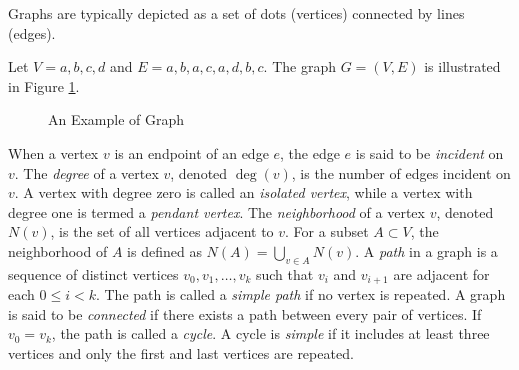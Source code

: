 Graphs are typically depicted as a set of dots (vertices) connected by lines (edges).

\begin{example}
\label{ex:Graph-Example}
Let $V = {a, b, c, d}$ and $E = { {a, b}, {a, c}, {a, d}, {b, c} }$. The graph $G = (V, E)$ is illustrated in Figure \ref{fig:Graph-Example}.
\end{example}

\begin{figure}[t]
\centering
{}
\caption{\label{fig:Graph-Example}An Example of Graph}
\end{figure}

When a vertex $v$ is an endpoint of an edge $e$, the edge $e$ is said to be \emph{incident} on $v$. The \emph{degree} of a vertex $v$, denoted $\deg(v)$, is the number of edges incident on $v$. A vertex with degree zero is called an \emph{isolated vertex}, while a vertex with degree one is termed a \emph{pendant vertex}. The \emph{neighborhood} of a vertex $v$, denoted $N(v)$, is the set of all vertices adjacent to $v$. For a subset $A \subset V$, the neighborhood of $A$ is defined as $N(A) = \bigcup_{v \in A} N(v)$. A \emph{path} in a graph is a sequence of distinct vertices ${v_0, v_1, \ldots, v_k}$ such that $v_i$ and $v_{i+1}$ are adjacent for each $0 \leq i < k$. The path is called a \emph{simple path} if no vertex is repeated. A graph is said to be \emph{connected} if there exists a path between every pair of vertices. If $v_0 = v_k$, the path is called a \emph{cycle}. A cycle is \emph{simple} if it includes at least three vertices and only the first and last vertices are repeated.

